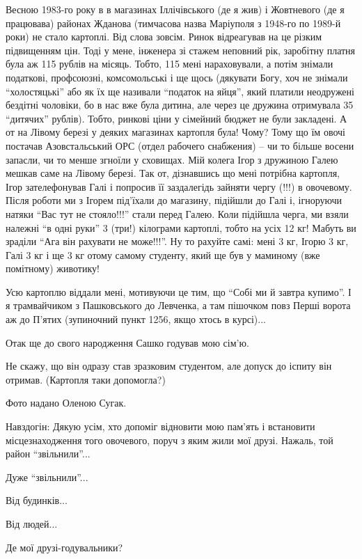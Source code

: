 Весною 1983-го року в в магазинах Іллічівського (де я жив) і Жовтневого (де я
працювава) районах Жданова (тимчасова назва Маріуполя з 1948-го по 1989-й
роки) не стало картоплі. Від слова зовсім. Ринок відреагував на це різким
підвищенням цін. Тоді у мене, інженера зі стажем неповний рік, заробітну
платня була аж 115 рублів на місяць. Тобто, 115 мені нараховували, а потім
знімали податкові, профсоюзні, комсомольські і ще щось (дякувати Богу, хоч не
знімали \enquote{холостяцькі} або як їх ще називали \enquote{податок на яйця}, який платили
неодружені бездітні чоловіки, бо в нас вже була дитина, але через це дружина
отримувала 35 \enquote{дитячих} рублів). Тобто, ринкові ціни у сімейний бюджет не були
закладені. А от на Лівому березі у деяких магазинах картопля була! Чому? Тому
що їм овочі постачав Азовстальський ОРС (отдел рабочего снабжения) – чи то
більше восени запасли, чи то менше згноїли у сховищах. Мій колега Ігор з
дружиною Галею мешкав саме на Лівому березі. Так от, дізнавшись що мені
потрібна картопля, Ігор зателефонував Галі і попросив її заздалегідь зайняти
чергу (!!!) в овочевому. Після роботи ми з Ігорем під'їхали до магазину,
підійшли до Галі і, ігноруючи натяки \enquote{Вас тут не стояло!!!} стали перед Галею.
Коли підійшла черга, ми взяли належні \enquote{в одні руки} 3 (три!) кілограми
картоплі, тобто на усіх 12 кг! Мабуть ви зраділи \enquote{Ага він рахувати не
може!!!}. Ну то рахуйте самі: мені 3 кг, Ігорю 3 кг, Галі 3 кг і ще 3 кг отому
самому студенту, який ще був у маминому (вже помітному) животику!

Усю картоплю віддали мені, мотивуючи це тим, що \enquote{Собі ми й завтра купимо}. І я
трамвайчиком з Пашковського до Левченка, а там пішочком повз Перші ворота аж
до П'ятих (зупиночний пункт 1256, якщо хтось в курсі)... 

Отак ще до свого народження Сашко годував мою сім'ю. 

Не скажу, що він одразу став зразковим студентом, але допуск до іспиту він отримав. (Картопля таки допомогла?)

Фото надано Оленою Сугак.

Навздогін: Дякую усім, хто допоміг відновити мою пам'ять і встановити
місцезнаходження того овочевого, поруч з яким жили мої друзі. Нажаль, той
район \enquote{звільнили}... 

Дуже \enquote{звільнили}...

Від будинків... 

Від людей...

Де мої друзі-годувальники?
